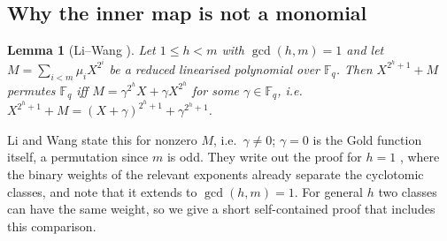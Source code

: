 \documentclass[preprint,12pt]{elsarticle}
\newtheorem{lemma}[theorem]{Lemma}
\theoremstyle{definition}
\newcommand{\F}{\mathbb{F}}
\begin{document}
\subsection*{Why the inner map is not a monomial}
\begin{lemma}[Li--Wang {\cite[Thm.~4]{LW}}]\label{lem:LW}
Let $1\le h<m$ with $\gcd(h,m)=1$ and let $M=\sum_{i<m}\mu_iX^{2^i}$ be a reduced linearised polynomial over $\F_q$. Then $X^{2^h+1}+M$ permutes $\F_q$ iff $M=\gamma^{2^h}X+\gamma X^{2^h}$ for some $\gamma\in\F_q$, i.e.\ $X^{2^h+1}+M=(X+\gamma)^{2^h+1}+\gamma^{2^h+1}$.
\end{lemma}
Li and Wang state this for nonzero $M$, i.e.\ $\gamma\neq0$; $\gamma=0$ is the Gold function itself, a permutation since $m$ is odd. They write out the proof for $h=1$ \cite[Thm.~2]{LW}, where the binary weights of the relevant exponents already separate the cyclotomic classes, and note that it extends to $\gcd(h,m)=1$. For general $h$ two classes can have the same weight, so we give a short self-contained proof that includes this comparison.
\end{document}
